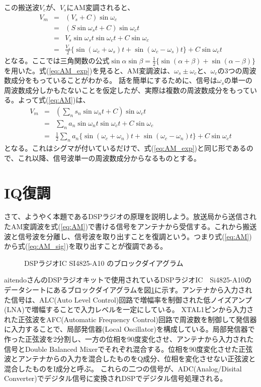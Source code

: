 この搬送波$V_c$が、$V_s$にAM変調されると、
\begin{eqnarray}
V_m &=& (V_s + C)\sin\omega_c \label{eq:AM}\\ 
&=&(S\sin\omega_s t + C)\sin\omega_c t \nonumber \\
&=& V_s\sin\omega_s t \sin\omega_c t + C\sin\omega_c \nonumber \\
&=& \frac{V_s}{2}\{\sin(\omega_c + \omega_s)t + \sin(\omega_c - \omega_s)t\} + C\sin\omega_ct \label{eq:AM_exp}
\end{eqnarray}
となる。ここでは三角関数の公式$\sin\alpha\sin\beta=\frac{1}{2}\{\sin(\alpha+\beta)+\sin(\alpha-\beta)\}$を用いた。式(\ref{eq:AM_exp})を見ると、AM変調波は、$\omega_s \pm \omega_c$と、$\omega_c$の3つの周波数成分をもっていることがわかる。
話を簡単にするために、信号は$\omega_s$の単一の周波数成分しかもたないことを仮定したが、実際は複数の周波数成分をもっている。よって式(\ref{eq:AM})は、
\begin{eqnarray}
V_m &=&  (\sum_n s_n\sin\omega_n t + C)\sin\omega_c t \nonumber \\
&=& \sum_n a_n\sin\omega_n t \sin\omega_c t + C\sin\omega_c \nonumber \\
&=& \frac{1}{2}\sum_n{a_n\{\sin(\omega_c + \omega_n)t + \sin(\omega_c - \omega_n)t}\} + C\sin\omega_ct \nonumber
\end{eqnarray}
となる。これはシグマが付いているだけで、式(\ref{eq:AM_exp})と同じ形であるので、これ以降、信号波単一の周波数成分からなるものとする。

\section*{IQ復調}
さて、ようやく本題であるDSPラジオの原理を説明しよう。放送局から送信されたAM変調波を式(\ref{eq:AM})で書ける信号をアンテナから受信する。これから搬送波と信号波を分離し、信号波を取り出すことを復調という。つまり式(\ref{eq:AM})から式(\ref{eq:AM_sig})を取り出すことが復調である。

\begin{figure}
\caption{DSPラジオIC SI4825-A10 のブロックダイアグラム}
\label{fig:block}
\end{figure}
aitendoさんのDSPラジオキットで使用されているDSPラジオIC　Si4825-A10のデータシートにあるブロックダイアグラムを図\ref{fig:block}に示す。アンテナから入力された信号は、ALC(Auto Level Control)回路で増幅率を制御された低ノイズアンプ(LNA)で増幅することで入力レベルを一定にしている。
XTAL1ピンから入力された正弦波をAFC(Automatic Frequency Control)回路で周波数を制御して発信器に入力することで、局部発信器(Local Oscillator)を構成している。局部発信器で作った正弦波を2分割し、一方の位相を90度変化させ、アンテナから入力された信号とDouble Balanced Mixerでそれぞれ混合する。位相を90度変化させた正弦波とアンテナからの入力を混合したものをQ成分、位相を変化させない正弦波と混合したものをI成分と呼ぶ。
これらの二つの信号が、ADC(Analog/Disital Converter)でデジタル信号に変換されDSPでデジタル信号処理される。

